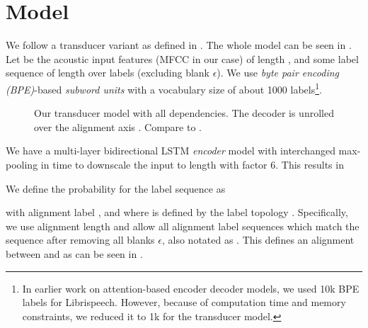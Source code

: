 \documentclass[a4paper]{article}
\newcommand{\blank}{\ensuremath{\epsilon}}
\begin{document}
\section{Model}

We follow a transducer variant as defined in \cite{zeyer2020:transducer}.
The whole model can be seen in .
Let  be the acoustic input features (MFCC in our case) of length ,
and  some label sequence of length  over labels 
(excluding blank \blank).
We use \emph{byte pair encoding (BPE)}-based \emph{subword units}
\cite{sennrich2015neuralbpe,zeyer2018:asr-attention}
with a vocabulary size of about 1000 labels\footnote{In earlier work on attention-based encoder decoder models,
we used 10k BPE labels for Librispeech.
However, because of computation time and memory constraints,
we reduced it to 1k for the transducer model.}.

\begin{figure}
\caption[Transducer model]{Our transducer model with all dependencies.
The decoder is unrolled over the alignment axis .
Compare to \cite{zeyer2020:transducer}.}
\label{fig:librispeech_transducer}
\end{figure}

We have a multi-layer bidirectional LSTM \cite{hochreiter1997lstm} \emph{encoder} model
with interchanged max-pooling in time to downscale the input to length 
with factor 6.
This results in


We define the probability for the label sequence  as

with alignment label ,
and where  is defined by the label topology .
Specifically, we use alignment length 
and allow all alignment label sequences 
which match the sequence  after removing all blanks \blank,
also notated as .
This defines an alignment between  and 
as can be seen in .
\end{document}
